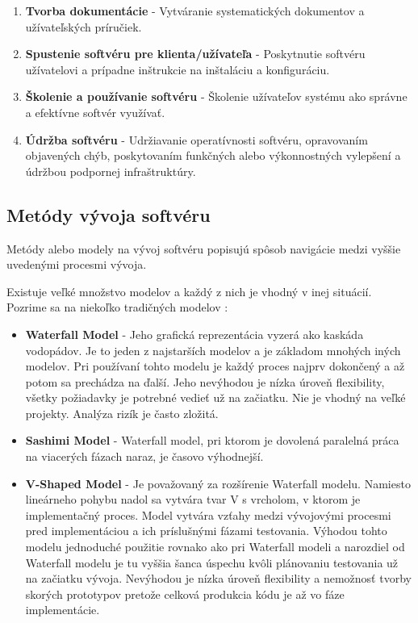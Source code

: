 \documentclass[10pt,twoside,slovak,a4paper]{article}
\begin{document}
\begin{sloppypar}
\begin{enumerate}
\item \textbf{Tvorba dokumentácie} - Vytváranie systematických dokumentov a užívateľských príručiek.
\item \textbf{Spustenie softvéru pre klienta/užívateľa} - Poskytnutie softvéru užívatelovi a prípadne inštrukcie na inštaláciu a konfiguráciu.
\item \textbf{Školenie a používanie softvéru} - Školenie užívateľov systému ako správne a efektívne softvér využívať.
\item \textbf{Údržba softvéru} - Udržiavanie operatívnosti softvéru, opravovaním objavených chýb, poskytovaním funkčných alebo výkonnostných vylepšení a údržbou podpornej infraštruktúry.
\end{enumerate}
\end{sloppypar}




\subsection{Metódy vývoja softvéru} \label{metody:vyvojSoftveru}
Metódy alebo modely na vývoj softvéru popisujú spôsob navigácie medzi vyššie uvedenými procesmi vývoja.\cite{ModelDef}

Existuje veľké množstvo modelov a každý z nich je vhodný v inej situácií. Pozrime sa na niekoľko tradičných modelov \cite{Methodologies}:
\begin{itemize}
\item \textbf{Waterfall Model} - Jeho grafická reprezentácia vyzerá ako kaskáda vodopádov. Je to jeden z najstarších modelov a je základom mnohých iných modelov. Pri používaní tohto modelu je každý proces najprv dokončený a až potom sa prechádza na ďalší. Jeho nevýhodou je nízka úroveň flexibility, všetky požiadavky je potrebné vedieť už na začiatku. Nie je vhodný na veľké projekty. Analýza rizík je často zložitá.
\item \textbf{Sashimi Model} - Waterfall model, pri ktorom je dovolená paralelná práca na viacerých fázach naraz, je časovo výhodnejší.
\item \textbf{V-Shaped Model} - Je považovaný za rozšírenie Waterfall modelu. Namiesto lineárneho pohybu nadol sa vytvára tvar V s vrcholom, v ktorom je implementačný proces. Model vytvára vzťahy medzi vývojovými procesmi pred implementáciou a ich príslušnými fázami testovania. Výhodou tohto modelu jednoduché použitie rovnako ako pri Waterfall modeli a narozdiel od Waterfall modelu je tu vyššia šanca úspechu kvôli plánovaniu testovania už na začiatku vývoja. Nevýhodou je nízka úroveň flexibility a nemožnosť tvorby skorých prototypov pretože celková produkcia kódu je až vo fáze implementácie.
\end{itemize}
\end{document}
